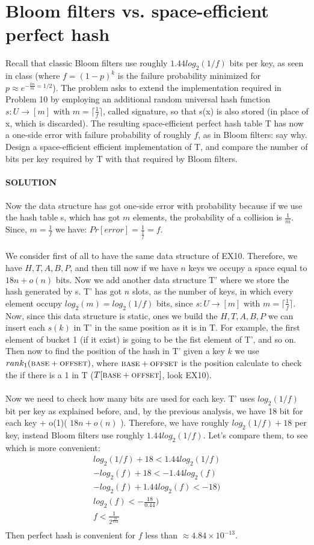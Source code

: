 \documentclass[a4paper]{article}
\newcommand\ceil[1]{\lceil#1\rceil}
\begin{document}
\section*{Bloom filters vs. space-efficient perfect hash}
Recall that classic Bloom filters use roughly $1.44 log_2(1/f)$ bits per key, as seen in class (where $f = (1 − p)^k$ is the failure probability minimized for $p \approx e^{− \frac{kn}{m}= 1/2}$). The problem asks to extend the implementation required in Problem 10 by employing an additional random universal hash function $s : U \rightarrow [m]$ with $m =\ceil{\frac{1}{f}}$, called signature, so that s(x) is also stored (in
place of x, which is discarded). The resulting space-efficient perfect hash table T has now a one-side error with failure probability of roughly $f$, as in Bloom filters: say why. Design a space-efficient efficient implementation of T, and compare the number of bits per key required by T with that required by Bloom filters.
\\
\\
\textbf{SOLUTION}
\\
\\
Now the data structure has got one-side error with probability because if we use the hash table s, which has got $m$ elements, the probability of a collision is $\frac{1}{m}$. Since, $m=\frac{1}{f}$ we have: $Pr[error]=\frac{1}{\frac{1}{f}}=f$.
\\
\\
We consider first of all to have the same data structure of EX10. Therefore, we have $H,T,A,B,P$, and then till now if we have $n$ keys we occupy a space equal to $18n + o(n)$ bits. Now we add another data structure T' where we store the hash generated by s. T' has got $n$ slots, as the number of keys, in which every element occupy $log_2(m)=log_2(1/f)$ bits, since $s : U \rightarrow [m]$ with $m =\ceil{\frac{1}{f}}$. Now, since this data structure is static, ones we build the $H,T,A,B,P$ we can insert each $s(k)$ in T' in the same position as it is in T. For example, the first element of bucket 1 (if it exist) is going to be the fist element of T', and so on. Then now to find the position of the hash in T' given a key $k$ we use $rank_1(\textsc{base}+\textsc{offset})$, where $\textsc{base}+\textsc{offset}$ is the position calculate to check the if there is a 1 in T ($T[\textsc{base}+\textsc{offset}]$, look EX10).
\\ 
\\
Now we need to check how many bits are used for each key. T' uses $log_2(1/f)$ bit per key as explained before, and, by the previous analysis, we have 18 bit for each key + o(1)( $18n + o(n)$ ). Therefore, we have roughly $log_2(1/f) + 18$ per key, instead Bloom filters use roughly $1.44 log_2(1/f)$. Let's compare them, to see which is more convenient:
\begin{align*}
log_2(1/f) + 18 < 1.44 log_2(1/f) \\
-log_2(f) + 18 < - 1.44 log_2(f) \\
-log_2(f) + 1.44 log_2(f) < - 18) \\
log_2(f) < -\frac{18}{0.44}) \\
f < \frac{1}{2^{\frac{18}{0.44}}} \\
\end{align*}
Then perfect hash is convenient for $f$ less than $\approx 4.84 \times 10^{-13}$.
\end{document}

